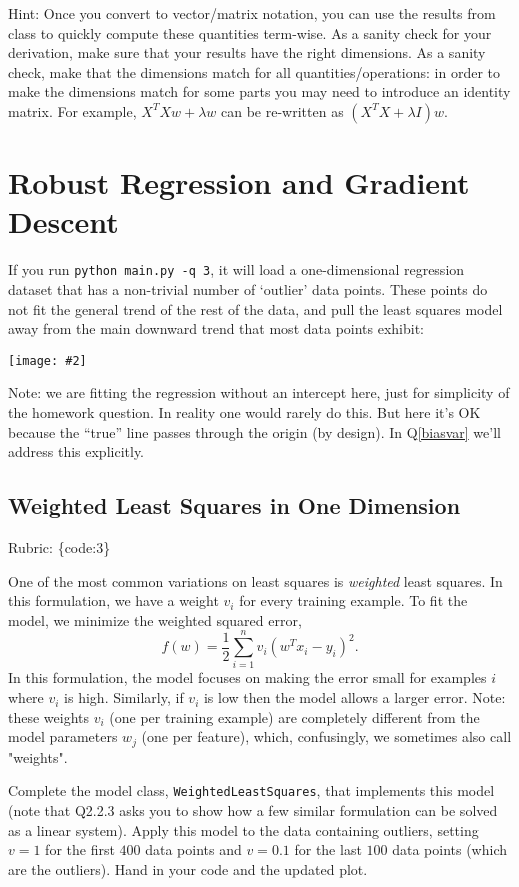 \documentclass{article}
\def\rubric#1{\gre{Rubric: \{#1\}}}{}
\def\blu#1{{\color{blu}#1}}
\def\gre#1{{\color{gre}#1}}
\def\red#1{{\color{red}#1}}
\newcommand{\centerfig}[2]{\begin{center}\texttt{[image: \#2]}\end{center}}
\begin{document}
Hint: Once you convert to vector/matrix notation, you can use the results from class to quickly compute these quantities term-wise.
As a sanity check for your derivation, make sure that your results have the right dimensions. \red{As a sanity check, make that the dimensions match for all quantities/operations: in order to make the dimensions match for some parts you may need to introduce an identity matrix. For example, $X^TXw + \lambda w$ can be re-written as $(X^TX + \lambda I)w$.}



\section{Robust Regression and Gradient Descent}

If you run \verb|python main.py -q 3|, it will load a one-dimensional regression
dataset that has a non-trivial number of `outlier' data points.
These points do not fit the general trend of the rest of the data,
and pull the least squares model away from the main downward trend that most data points exhibit:
\centerfig{.7}{../figs/least_squares_outliers.pdf}

Note: we are fitting the regression without an intercept here, just for simplicity of the homework question.
In reality one would rarely do this. But here it's OK because the ``true'' line
passes through the origin (by design). In Q\ref{biasvar} we'll address this explicitly.

\subsection{Weighted Least Squares in One Dimension}
\rubric{code:3}

One of the most common variations on least squares is \emph{weighted} least squares. In this formulation, we have a weight $v_i$ for every training example. To fit the model, we minimize the weighted squared error,
\[
f(w) =  \frac{1}{2}\sum_{i=1}^n v_i(w^Tx_i - y_i)^2.
\]
In this formulation, the model focuses on making the error small for examples $i$ where $v_i$ is high. Similarly, if $v_i$ is low then the model allows a larger error. Note: these weights $v_i$ (one per training example) are completely different from the model parameters $w_j$ (one per feature), which, confusingly, we sometimes also call "weights".

Complete the model class, \texttt{WeightedLeastSquares}, that implements this model
(note that Q2.2.3 asks you to show how a few similar formulation can be solved as a linear system).
Apply this model to the data containing outliers, setting $v = 1$ for the first
$400$ data points and $v = 0.1$ for the last $100$ data points (which are the outliers).
\blu{Hand in your code and the updated plot}.
\end{document}
